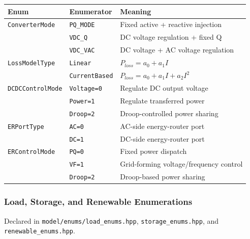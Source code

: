 \begin{center}
\begin{tabular}{lll}
\hline\hline
\textbf{Enum} & \textbf{Enumerator} & \textbf{Meaning} \\
\hline
\texttt{ConverterMode} & \texttt{PQ\_MODE} & Fixed active + reactive injection \\
 & \texttt{VDC\_Q} & DC voltage regulation + fixed Q \\
 & \texttt{VDC\_VAC} & DC voltage + AC voltage regulation \\
\hline
\texttt{LossModelType} & \texttt{Linear} & \(P_{loss}=a_0+a_1 I\) \\
 & \texttt{CurrentBased} & \(P_{loss}=a_0+a_1 I+a_2 I^2\) \\
\hline
\texttt{DCDCControlMode} & \texttt{Voltage=0} & Regulate DC output voltage \\
 & \texttt{Power=1} & Regulate transferred power \\
 & \texttt{Droop=2} & Droop-controlled power sharing \\
\hline
\texttt{ERPortType} & \texttt{AC=0} & AC-side energy-router port \\
 & \texttt{DC=1} & DC-side energy-router port \\
\hline
\texttt{ERControlMode} & \texttt{PQ=0} & Fixed power dispatch \\
 & \texttt{VF=1} & Grid-forming voltage/frequency control \\
 & \texttt{Droop=2} & Droop-based power sharing \\
\hline\hline
\end{tabular}
\end{center}

\subsubsection{Load, Storage, and Renewable Enumerations}

Declared in \texttt{model/enums/load\_enums.hpp}, \texttt{storage\_enums.hpp},
and \texttt{renewable\_enums.hpp}.

